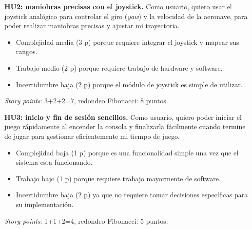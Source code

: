 \documentclass[
11pt, %
]{charter}
\begin{document}
	\textbf{HU2: maniobras precisas con el joystick.} Como usuario, quiero usar el joystick analógico para controlar el giro (\textit{yaw}) y la velocidad de la aeronave, para poder realizar maniobras precisas y ajustar mi trayectoria.

	\begin{itemize}
		\item Complejidad media (3 p) porque requiere integrar el joystick y mapear sus rangos.
		\item Trabajo medio (2 p) porque requiere trabajo de hardware y software. 
		\item Incertidumbre baja (2 p) porque el módulo de joystick es simple de utilizar. 
	\end{itemize}
	\textit{Story points}: 3+2+2=7, redondeo Fibonacci: 8 puntos.
		
		
	\textbf{HU3: inicio y fin de sesión sencillos.} Como usuario, quiero poder iniciar el juego rápidamente al encender la consola y finalizarla fácilmente cuando termine de jugar para gestionar eficientemente mi tiempo de juego.

	\begin{itemize}
		\item Complejidad baja (1 p) porque es una funcionalidad simple una vez que el sistema esta funcionando.
		\item Trabajo bajo (1 p) porque requiere trabajo mayormente de software. 
		\item Incertidumbre baja (2 p) ya que no requiere tomar decisiones específicas para su implementación. 
	\end{itemize}
	\textit{Story points}: 1+1+2=4, redondeo Fibonacci: 5 puntos.
		
\end{document}
